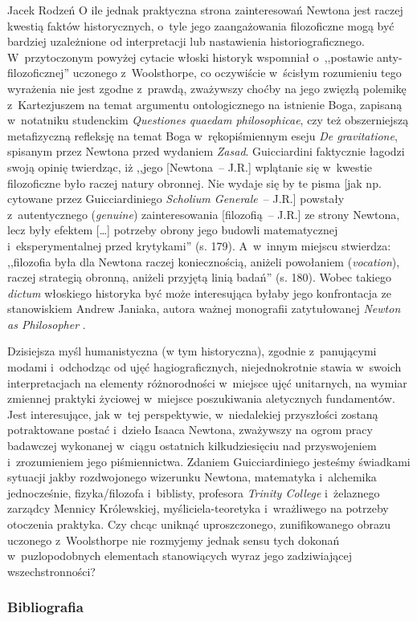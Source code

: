 \begin{recplenv}{Jacek Rodzeń}
O ile jednak praktyczna strona zainteresowań Newtona jest raczej kwestią faktów historycznych, o~tyle jego
zaangażowania filozoficzne mogą być bardziej uzależnione od interpretacji lub nastawienia
historiograficznego. W~przytoczonym powyżej cytacie włoski historyk wspomniał o~,,postawie anty-filozoficznej''
uczonego z~Woolsthorpe, co
oczywiście w~ścisłym rozumieniu tego wyrażenia nie jest zgodne z~prawdą, zważywszy choćby na jego zwięzłą
polemikę z~Kartezjuszem na temat argumentu ontologicznego na istnienie Boga, zapisaną w~notatniku studenckim
\textit{Questiones
quaedam philosophicae}, czy też obszerniejszą metafizyczną refleksję na temat Boga w~rękopiśmiennym eseju \textit{De
gravitatione}, spisanym przez Newtona przed wydaniem \textit{Zasad}. Guicciardini faktycznie łagodzi swoją opinię
twierdząc, iż ,,jego [Newtona~-- J.R.] wplątanie się w~kwestie filozoficzne było raczej natury obronnej. Nie wydaje się
by te pisma [jak np. cytowane przez Guicciardiniego \textit{Scholium Generale}~-- J.R.] powstały z~autentycznego
(\textit{genuine}) zainteresowania [filozofią~-- J.R.] ze strony Newtona, lecz były efektem […] potrzeby obrony jego
budowli matematycznej i~eksperymentalnej przed krytykami'' (s. 179). A~w~innym miejscu stwierdza: ,,filozofia była dla
Newtona raczej koniecznością, aniżeli powołaniem (\textit{vocation}), raczej strategią obronną, aniżeli przyjętą linią
badań'' (s. 180). Wobec takiego \textit{dictum} włoskiego historyka być może interesująca byłaby jego konfrontacja ze
stanowiskiem Andrew Janiaka, autora ważnej monografii zatytułowanej
\textit{Newton as Philosopher} \parencite*{janiak_newton_2008}.

Dzisiejsza myśl humanistyczna (w tym historyczna), zgodnie z~panującymi modami i~odchodząc od ujęć hagiograficznych,
niejednokrotnie stawia w~swoich interpretacjach na elementy różnorodności w~miejsce ujęć unitarnych, na wymiar zmiennej
praktyki życiowej w~miejsce poszukiwania aletycznych fundamentów. Jest interesujące, jak w~tej
perspektywie, w~niedalekiej przyszłości zostaną potraktowane postać i~dzieło Isaaca Newtona, zważywszy
na ogrom pracy badawczej
wykonanej w~ciągu ostatnich kilkudziesięciu nad przyswojeniem i~zrozumieniem jego piśmiennictwa. Zdaniem
Guicciardiniego jesteśmy świadkami sytuacji jakby rozdwojonego wizerunku Newtona, matematyka i~alchemika jednocześnie,
fizyka/filozofa i~biblisty, profesora \textit{Trinity College} i~żelaznego zarządcy Mennicy Królewskiej,
myśliciela-teoretyka i~wrażliwego na potrzeby otoczenia praktyka. Czy chcąc uniknąć uproszczonego, zunifikowanego
obrazu uczonego z~Woolsthorpe nie rozmyjemy jednak sensu tych dokonań w~puzlopodobnych elementach stanowiących wyraz
jego zadziwiającej wszechstronności? 





\subsubsection{Bibliografia}\nopagebreak[4]
\end{recplenv}
